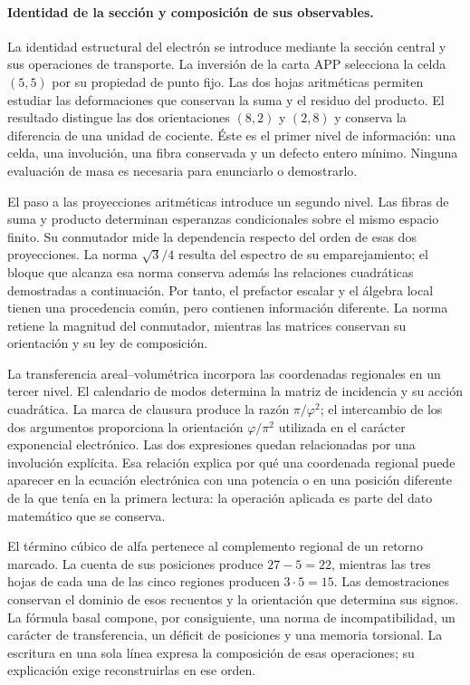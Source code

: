 \paragraph{Identidad de la sección y composición de sus observables.}
\label{el-ampl-articulacion}
La identidad estructural del electrón se introduce mediante la sección
central y sus operaciones de transporte. La inversión de la carta APP
selecciona la celda $(5,5)$ por su propiedad de punto fijo. Las dos hojas
aritméticas permiten estudiar las deformaciones que conservan la suma y
el residuo del producto. El resultado distingue las dos orientaciones
$(8,2)$ y $(2,8)$ y conserva la diferencia de una unidad de cociente.
Éste es el primer nivel de información: una celda, una involución, una
fibra conservada y un defecto entero mínimo. Ninguna evaluación de masa
es necesaria para enunciarlo o demostrarlo.

El paso a las proyecciones aritméticas introduce un segundo nivel. Las
fibras de suma y producto determinan esperanzas condicionales sobre el
mismo espacio finito. Su conmutador mide la dependencia respecto del
orden de esas dos proyecciones. La norma $\sqrt3/4$ resulta del espectro
de su emparejamiento; el bloque que alcanza esa norma conserva además
las relaciones cuadráticas demostradas a continuación. Por tanto, el
prefactor escalar y el álgebra local tienen una procedencia común, pero
contienen información diferente. La norma retiene la magnitud del
conmutador, mientras las matrices conservan su orientación y su ley de
composición.

La transferencia areal--volumétrica incorpora las coordenadas regionales
en un tercer nivel. El calendario de modos determina la matriz de
incidencia y su acción cuadrática. La marca de clausura produce la razón
$\pi/\varphi^2$; el intercambio de los dos argumentos proporciona la
orientación $\varphi/\pi^2$ utilizada en el carácter exponencial
electrónico. Las dos expresiones quedan relacionadas por una involución
explícita. Esa relación explica por qué una coordenada regional puede
aparecer en la ecuación electrónica con una potencia o en una posición
diferente de la que tenía en la primera lectura: la operación aplicada
es parte del dato matemático que se conserva.

El término cúbico de alfa pertenece al complemento regional de un retorno
marcado. La cuenta de sus posiciones produce $27-5=22$, mientras las
tres hojas de cada una de las cinco regiones producen $3\cdot5=15$.
Las demostraciones conservan el dominio de esos recuentos y la
orientación que determina sus signos. La fórmula basal compone,
por consiguiente, una norma de incompatibilidad, un carácter de
transferencia, un déficit de posiciones y una memoria torsional.
La escritura en una sola línea expresa la composición de esas
operaciones; su explicación exige reconstruirlas en ese orden.


